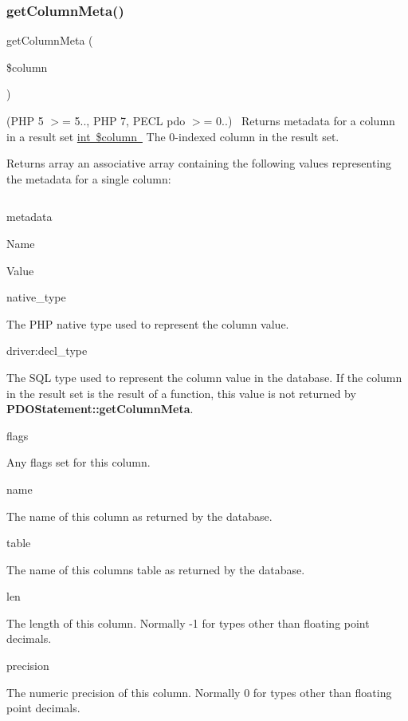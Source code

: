 \subsubsection{\texorpdfstring{get\+Column\+Meta()}{getColumnMeta()}}
{\footnotesize\ttfamily get\+Column\+Meta (\begin{DoxyParamCaption}\item[{}]{\$column }\end{DoxyParamCaption})}

(P\+HP 5 $>$= 5.., P\+HP 7, P\+E\+CL pdo $>$= 0..)~\newline
 Returns metadata for a column in a result set \mbox{\hyperlink{}{int \$column }} The 0-\/indexed column in the result set. 

\begin{DoxyReturn}{Returns}
array an associative array containing the following values representing the metadata for a single column\+: 
\end{DoxyReturn}
\tabulinesep=1mm
\begin{longtabu} spread 0pt [c]{*{0}{|X[-1]}|}
\hline
\end{longtabu}
metadata 

Name 

Value  

native\+\_\+type 

The P\+HP native type used to represent the column value.  

driver\+:decl\+\_\+type 

The S\+QL type used to represent the column value in the database. If the column in the result set is the result of a function, this value is not returned by {\bfseries P\+D\+O\+Statement\+::get\+Column\+Meta}.   

flags 

Any flags set for this column.  

name 

The name of this column as returned by the database.  

table 

The name of this column\textquotesingle{}s table as returned by the database.  

len 

The length of this column. Normally -\/1 for types other than floating point decimals.  

precision 

The numeric precision of this column. Normally 0 for types other than floating point decimals.  

